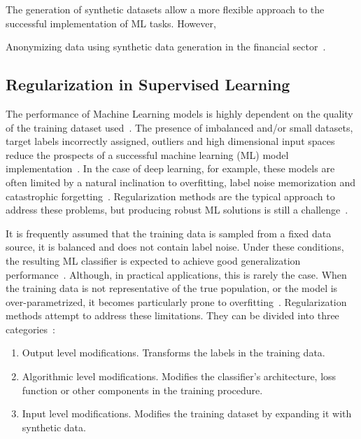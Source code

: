 \documentclass[parskip=full]{scrartcl}
\begin{document}
The generation of synthetic datasets allow a more flexible approach to the
successful implementation of ML tasks. However,

Anonymizing data using synthetic data generation in the financial
sector~\cite{assefa2020generating}.






\subsection{Regularization in Supervised Learning}

The performance of Machine Learning models is highly dependent on the quality
of the training dataset used~\cite{Fenza2021, Halevy2009}. The presence of
imbalanced and/or small datasets, target labels incorrectly assigned, outliers
and high dimensional input spaces reduce the prospects of a successful machine
learning (ML) model implementation~\cite{Halevy2009, Domingos2012,
Salman2019}. In the case of deep learning, for example, these
models are often limited by a natural inclination to overfitting, label noise
memorization and catastrophic forgetting~\cite{Xie2021}. Regularization
methods are the typical approach to address these problems, but producing
robust ML solutions is still a challenge~\cite{Zhang2021}.

It is frequently assumed that the training data is sampled from a fixed data
source, it is balanced and does not contain label noise. Under these
conditions, the resulting ML classifier is expected to achieve good
generalization performance~\cite{benning2018modern}. Although, in practical
applications, this is rarely the case. When the training data is not
representative of the true population, or the model is over-parametrized, it
becomes particularly prone to overfitting~\cite{Bartlett2021}. Regularization
methods attempt to address these limitations. They can be divided into three
categories~\cite{santos2022avoiding}:

\begin{enumerate}
    \item Output level modifications. Transforms the labels in the training
        data.
    \item Algorithmic level modifications. Modifies the classifier's
        architecture, loss function or other components in the training
        procedure.
    \item Input level modifications. Modifies the training dataset by expanding it
        with synthetic data.
\end{enumerate}
\end{document}
